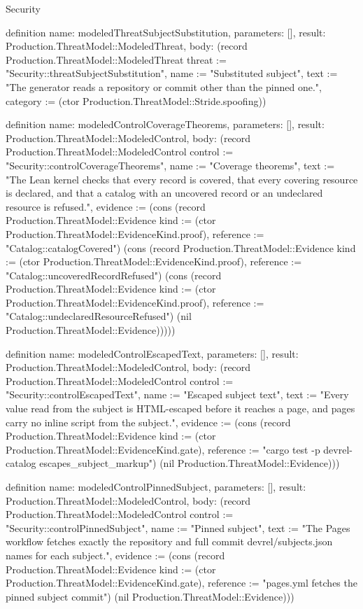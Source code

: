 \begin{lexlean}{Security}
\begin{semanticmodule}
definition{
  name: modeledThreatSubjectSubstitution,
  parameters: [],
  result: Production.ThreatModel::ModeledThreat,
  body: (record Production.ThreatModel::ModeledThreat {threat := "Security::threatSubjectSubstitution", name := "Substituted subject", text := "The generator reads a repository or commit other than the pinned one.", category := (ctor Production.ThreatModel::Stride.spoofing)})
}

definition{
  name: modeledControlCoverageTheorems,
  parameters: [],
  result: Production.ThreatModel::ModeledControl,
  body: (record Production.ThreatModel::ModeledControl {control := "Security::controlCoverageTheorems", name := "Coverage theorems", text := "The Lean kernel checks that every record is covered, that every covering resource is declared, and that a catalog with an uncovered record or an undeclared resource is refused.", evidence := (cons (record Production.ThreatModel::Evidence {kind := (ctor Production.ThreatModel::EvidenceKind.proof), reference := "Catalog::catalogCovered"}) (cons (record Production.ThreatModel::Evidence {kind := (ctor Production.ThreatModel::EvidenceKind.proof), reference := "Catalog::uncoveredRecordRefused"}) (cons (record Production.ThreatModel::Evidence {kind := (ctor Production.ThreatModel::EvidenceKind.proof), reference := "Catalog::undeclaredResourceRefused"}) (nil Production.ThreatModel::Evidence))))})
}

definition{
  name: modeledControlEscapedText,
  parameters: [],
  result: Production.ThreatModel::ModeledControl,
  body: (record Production.ThreatModel::ModeledControl {control := "Security::controlEscapedText", name := "Escaped subject text", text := "Every value read from the subject is HTML-escaped before it reaches a page, and pages carry no inline script from the subject.", evidence := (cons (record Production.ThreatModel::Evidence {kind := (ctor Production.ThreatModel::EvidenceKind.gate), reference := "cargo test -p devrel-catalog escapes_subject_markup"}) (nil Production.ThreatModel::Evidence))})
}

definition{
  name: modeledControlPinnedSubject,
  parameters: [],
  result: Production.ThreatModel::ModeledControl,
  body: (record Production.ThreatModel::ModeledControl {control := "Security::controlPinnedSubject", name := "Pinned subject", text := "The Pages workflow fetches exactly the repository and full commit devrel/subjects.json names for each subject.", evidence := (cons (record Production.ThreatModel::Evidence {kind := (ctor Production.ThreatModel::EvidenceKind.gate), reference := "pages.yml fetches the pinned subject commit"}) (nil Production.ThreatModel::Evidence))})
}


\end{semanticmodule}
\end{lexlean}
